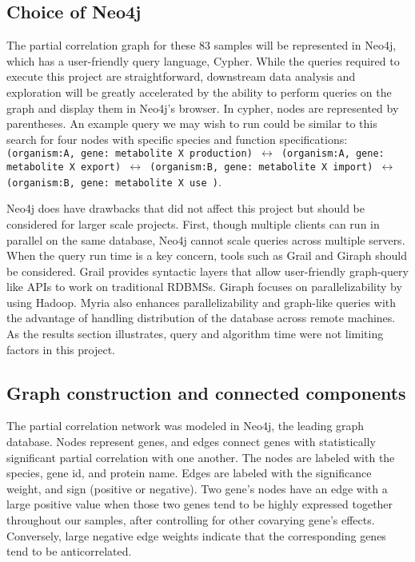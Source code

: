 \documentclass[12pt]{article}
\begin{document}
\subsection{Choice of Neo4j}

The partial correlation graph for these 83 samples will be represented in Neo4j, which has a user-friendly query language, Cypher. %
While the queries required to execute this project are straightforward, downstream data analysis and exploration will be greatly accelerated by the ability to perform queries on the graph and display them in Neo4j's browser. 
In cypher, nodes are represented by parentheses.  
An example query we may wish to run could be similar to this search for four nodes with specific species and function specifications: \texttt{(organism:A, gene: metabolite X production) $\leftrightarrow$ (organism:A, gene: metabolite X export) $\leftrightarrow$ (organism:B, gene: metabolite X import) $\leftrightarrow$ (organism:B, gene: metabolite X use )}.  

Neo4j does have drawbacks that did not affect this project but should be considered for larger scale projects.
First, though multiple clients can run in parallel on the same database, Neo4j cannot scale queries across multiple servers.  
When the query run time is a key concern, tools such as Grail and Giraph \cite{fan2015case} should be considered. 
Grail provides syntactic layers that allow user-friendly graph-query like APIs to work on traditional RDBMSs.
Giraph focuses on parallelizability by using Hadoop. 
Myria also enhances parallelizability and graph-like queries with the advantage of handling distribution of the database across remote machines. 
As the results section illustrates, query and algorithm time were not limiting factors in this project. 

\subsection{Graph construction and connected components}

The partial correlation network was modeled in Neo4j, the leading graph database.
Nodes represent genes, and edges connect genes with statistically significant partial correlation with one another. 
The nodes are labeled with the species, gene id, and protein name.
Edges are labeled with the significance weight, and sign (positive or negative). 
Two gene's nodes have an edge with a large positive value when those two genes tend to be highly expressed together throughout our samples, after controlling for other covarying gene's effects. 
Conversely, large negative edge weights indicate that the corresponding genes tend to be anticorrelated. 
\end{document}
